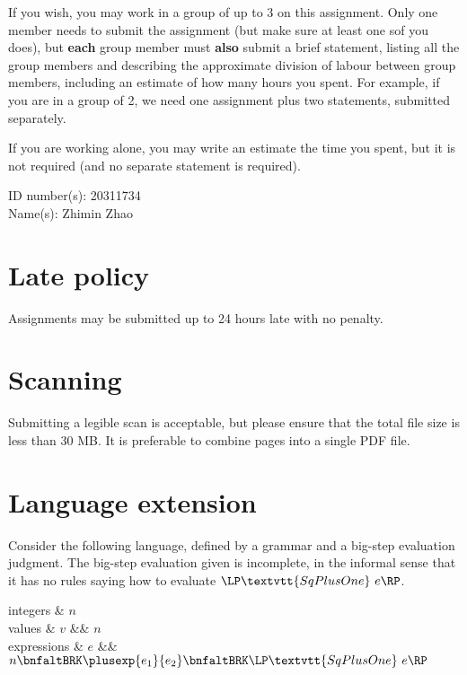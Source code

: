 \gdef\lecturenumber{a2}
\gdef\subsectioncounters{1}


\newcommand{\blanks}[1]{\ensuremath{\dashuline{\hspace{#1}}}}

\newcommand{\sqplusoneexp}[1]{\LP \textvtt{SqPlusOne}~{#1}\RP}


\date{due: Friday, 2022--02--11}
\vspace*{-2ex}

If you wish, you may work in a group of up to 3 on this assignment.
Only one member needs to submit the assignment (but make sure at least one sof you does),
but \textbf{each} group member must \textbf{also} submit a brief statement,
listing all the group members and describing
the approximate division of labour between group members, including an estimate of how
many hours you spent.  For example, if you are in a group of 2, we need one assignment
plus two statements, submitted separately.

If you are working alone, you may write an estimate the time you spent, but it is not required
(and no separate statement is required).

\bigskip

{\noindent ID number(s)}: 20311734\\[1ex]
{\noindent Name(s)}: Zhimin Zhao


\section*{Late policy}

Assignments may be submitted up to 24 hours late with no penalty.


\section*{Scanning}

Submitting a legible scan is acceptable, but please ensure that the total file size is less than 30 MB.
It is preferable to combine pages into a single PDF file.


\clearpage
\section{Language extension}
\label{sec:lang-ext}

Consider the following language, defined by a grammar and a big-step evaluation judgment.
The big-step evaluation given is incomplete, in the informal sense that it has no rules saying how to evaluate
$\sqplusoneexp{e}$.
%
\begin{grammar}
  integers & $n$
  \\
  values & $v$ &\bnfas& $n$
  \\
  expressions & $e$ &\bnfas& 
      $
      n
      \bnfaltBRK
      \plusexp{e_1}{e_2}
      \bnfaltBRK
      \sqplusoneexp{e}
      $
\end{grammar}


